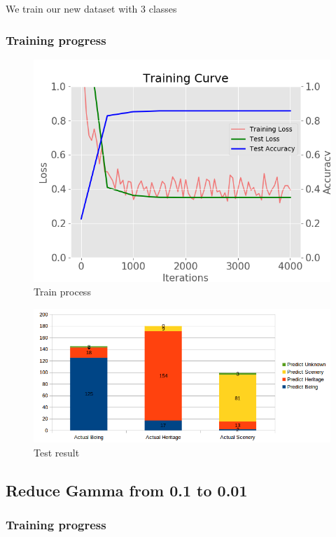 \documentclass[11pt]{article}
\begin{document}
We train our new dataset with 3 classes

\subsubsection{Training progress}

\begin{figure}[H]
\centering
\includegraphics[width=1\textwidth]{images/train_large_dataset}
\caption{Train process}
\end{figure}

\begin{figure}[H]
\centering
\includegraphics[width=1\textwidth]{images/result_large_dataset}
\caption{Test result}
\end{figure}


\subsection{Reduce Gamma from 0.1 to 0.01}

\subsubsection{Training progress}
\end{document}
